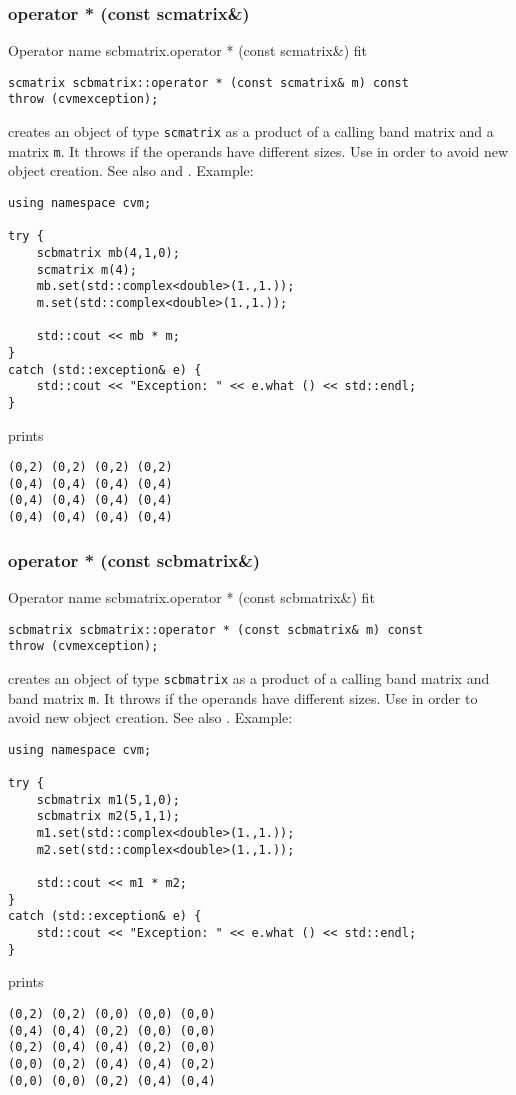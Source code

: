\subsubsection{operator * (const scmatrix\&)}
Operator%
\pdfdest name {scbmatrix.operator * (const scmatrix&)} fit
\begin{verbatim}
scmatrix scbmatrix::operator * (const scmatrix& m) const
throw (cvmexception);
\end{verbatim}
creates an object of type \verb"scmatrix"
as a product of a calling band matrix and a matrix \verb"m".
It throws  
if the operands have different sizes.
Use  in order to avoid
 new object creation.
See also
 and .
Example:
\begin{Verbatim}
using namespace cvm;

try {
    scbmatrix mb(4,1,0);
    scmatrix m(4);
    mb.set(std::complex<double>(1.,1.));
    m.set(std::complex<double>(1.,1.));

    std::cout << mb * m;
}
catch (std::exception& e) {
    std::cout << "Exception: " << e.what () << std::endl;
}
\end{Verbatim}
prints
\begin{Verbatim}
(0,2) (0,2) (0,2) (0,2)
(0,4) (0,4) (0,4) (0,4)
(0,4) (0,4) (0,4) (0,4)
(0,4) (0,4) (0,4) (0,4)
\end{Verbatim}
\newpage



\subsubsection{operator * (const scbmatrix\&)}
Operator%
\pdfdest name {scbmatrix.operator * (const scbmatrix&)} fit
\begin{verbatim}
scbmatrix scbmatrix::operator * (const scbmatrix& m) const
throw (cvmexception);
\end{verbatim}
creates an object of type \verb"scbmatrix"
as a product of a calling band matrix and  band matrix \verb"m".
It throws  
if the operands have different sizes.
Use  in order to avoid
 new object creation.
See also
.
Example:
\begin{Verbatim}
using namespace cvm;

try {
    scbmatrix m1(5,1,0);
    scbmatrix m2(5,1,1);
    m1.set(std::complex<double>(1.,1.));
    m2.set(std::complex<double>(1.,1.));

    std::cout << m1 * m2;
}
catch (std::exception& e) {
    std::cout << "Exception: " << e.what () << std::endl;
}
\end{Verbatim}
prints
\begin{Verbatim}
(0,2) (0,2) (0,0) (0,0) (0,0)
(0,4) (0,4) (0,2) (0,0) (0,0)
(0,2) (0,4) (0,4) (0,2) (0,0)
(0,0) (0,2) (0,4) (0,4) (0,2)
(0,0) (0,0) (0,2) (0,4) (0,4)
\end{Verbatim}
\newpage


